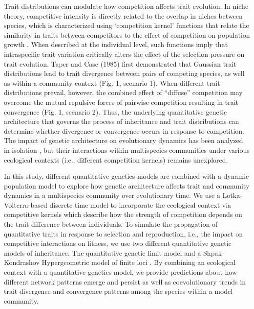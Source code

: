 \documentclass[12pt]{article}
\begin{document}
Trait distributions can modulate how competition affects trait evolution. In niche theory, competitive intensity is directly related to the overlap in niches between species, which is characterized using ‘competition kernel’ functions that relate the similarity in traits between competitors to the effect of competition on population growth \cite{PhysRevLett.98.258101,hernandez2009species,Leimar2013}. When described at the individual level, such functions imply that intraspecific trait variation critically alters the effect of the selection pressure on trait evolution. Taper and Case (1985) first demonstrated that Gaussian trait distributions lead to trait divergence between pairs of competing species, as well as within a community context (Fig. 1, scenario 1). When different trait distributions prevail, however, the combined effect of “diffuse” competition may overcome the mutual repulsive forces of pairwise competition resulting in trait convergence (Fig. 1, scenario 2). Thus, the underlying quantitative genetic architecture that governs the process of inheritance and trait distributions can determine whether divergence or convergence occurs in response to competition. The impact of genetic architecture on evolutionary dynamics has been analyzed in isolation \cite{yamauchi2009intraspecific,barabas2016effect,Barton2017}, but their interactions within multispecies communities under various ecological contexts (i.e., different competition kernels) remains unexplored.\par

In this study, different quantitative genetics models are combined with a dynamic population model to explore how genetic architecture affects trait and community dynamics in a multispecies community over evolutionary time. We use a Lotka-Volterra-based discrete time model to incorporate the ecological context via competitive kernels which describe how the strength of competition depends on the trait difference between individuals. To simulate the propagation of quantitative traits in response to selection and reproduction, i.e., the impact on competitive interactions on fitness, we use two different quantitative genetic models of inheritance. The quantitative genetic limit model \cite{Lande1976,Falconer1981,Barton2017} and a Shpak-Kondrashov Hypergeometric model of finite loci \cite{Shpak1999}. By combining an ecological context with a quantitative genetics model, we provide predictions about how different network patterns emerge and persist as well as coevolutionary trends in trait divergence and convergence patterns among the species within a model community.\par 
\end{document}
